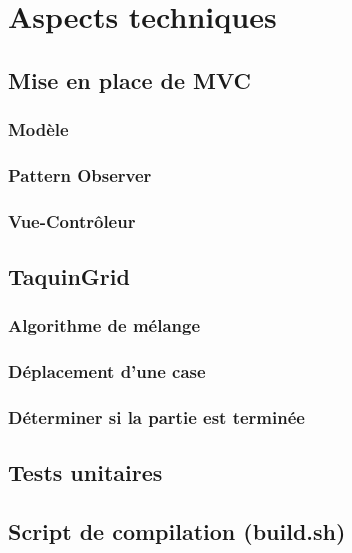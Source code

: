 \chapter{Aspects techniques}

	\section{Mise en place de MVC}

		\subsection{Modèle}



		\subsection{Pattern Observer}



		\subsection{Vue-Contrôleur}



	\section{TaquinGrid}

			\subsection{Algorithme de mélange}



			\subsection{Déplacement d'une case}



			\subsection{Déterminer si la partie est terminée}



	\section{Tests unitaires}



	\section{Script de compilation (build.sh)}
